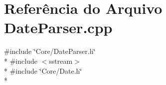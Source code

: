 \section{Referência do Arquivo Date\+Parser.\+cpp}
\label{_date_parser_8cpp}
{\ttfamily \#include \char`\"{}Core/\+Date\+Parser.\+h\char`\"{}}\\*
{\ttfamily \#include $<$sstream$>$}\\*
{\ttfamily \#include \char`\"{}Core/\+Date.\+h\char`\"{}}\\*

